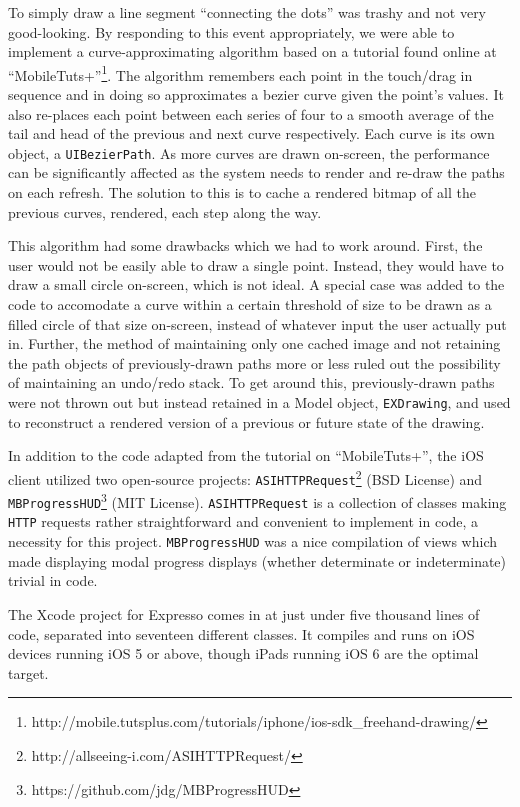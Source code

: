 \documentclass{acm_proc_article-sp}
\begin{document}
To simply draw a line segment ``connecting the dots'' was trashy and not very good-looking. By responding to this event appropriately, we were able to implement a curve-approximating algorithm based on a tutorial found online at ``MobileTuts+''\footnote{http://mobile.tutsplus.com/tutorials/iphone/ios-sdk\_freehand-drawing/}. The algorithm remembers each point in the touch/drag in sequence and in doing so approximates a bezier curve given the point's values. It also re-places each point between each series of four to a smooth average of the tail and head of the previous and next curve respectively. Each curve is its own object, a \texttt{UIBezierPath}. As more curves are drawn on-screen, the performance can be significantly affected as the system needs to render and re-draw the paths on each refresh. The solution to this is to cache a rendered bitmap of all the previous curves, rendered, each step along the way. 

This algorithm had some drawbacks which we had to work around. First, the user would not be easily able to draw a single point. Instead, they would have to draw a small circle on-screen, which is not ideal. A special case was added to the code to accomodate a curve within a certain threshold of size to be drawn as a filled circle of that size on-screen, instead of whatever input the user actually put in. Further, the method of maintaining only one cached image and not retaining the path objects of previously-drawn paths more or less ruled out the possibility of maintaining an undo/redo stack. To get around this, previously-drawn paths were not thrown out but instead retained in a Model object, \texttt{EXDrawing}, and used to reconstruct a rendered version of a previous or future state of the drawing.

In addition to the code adapted from the tutorial on ``MobileTuts+'', the iOS client utilized two open-source projects: \texttt{ASIHTTPRequest}\footnote{http://allseeing-i.com/ASIHTTPRequest/} (BSD License) and \texttt{MBProgressHUD}\footnote{https://github.com/jdg/MBProgressHUD} (MIT License). \texttt{ASIHTTPRequest} is a collection of classes making \texttt{HTTP} requests rather straightforward and convenient to implement in code, a necessity for this project. \texttt{MBProgressHUD} was a nice compilation of views which made displaying modal progress displays (whether determinate or indeterminate) trivial in code.

The Xcode project for Expresso comes in at just under five thousand lines of code, separated into seventeen different classes. It compiles and runs on iOS devices running iOS 5 or above, though iPads running iOS 6 are the optimal target.
\end{document}
